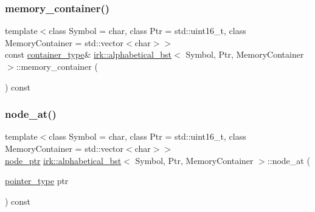 \mbox{\label{classirk_1_1alphabetical__bst_a273b1d4ffff62f2f8a034d979062e43c}} 
\subsubsection{\texorpdfstring{memory\+\_\+container()}{memory\_container()}}
{\footnotesize\ttfamily template$<$class Symbol = char, class Ptr = std\+::uint16\+\_\+t, class Memory\+Container = std\+::vector$<$char$>$$>$ \\
const \mbox{\hyperlink{classirk_1_1alphabetical__bst_aeed9efc6a48ff6d504a608e06223f386}{container\+\_\+type}}\& \mbox{\hyperlink{classirk_1_1alphabetical__bst}{irk\+::alphabetical\+\_\+bst}}$<$ Symbol, Ptr, Memory\+Container $>$\+::memory\+\_\+container (\begin{DoxyParamCaption}{ }\end{DoxyParamCaption}) const\hspace{0.3cm}{\ttfamily [inline]}}

\mbox{\label{classirk_1_1alphabetical__bst_a6330f671acd304c9ca37c3ac6aff3655}} 
\subsubsection{\texorpdfstring{node\+\_\+at()}{node\_at()}}
{\footnotesize\ttfamily template$<$class Symbol = char, class Ptr = std\+::uint16\+\_\+t, class Memory\+Container = std\+::vector$<$char$>$$>$ \\
\mbox{\hyperlink{structirk_1_1alphabetical__bst_1_1node__ptr}{node\+\_\+ptr}} \mbox{\hyperlink{classirk_1_1alphabetical__bst}{irk\+::alphabetical\+\_\+bst}}$<$ Symbol, Ptr, Memory\+Container $>$\+::node\+\_\+at (\begin{DoxyParamCaption}\item[{\mbox{\hyperlink{classirk_1_1alphabetical__bst_ae689c05ab96a71769e24908d5c73765c}{pointer\+\_\+type}}}]{ptr }\end{DoxyParamCaption}) const\hspace{0.3cm}{\ttfamily [inline]}}

